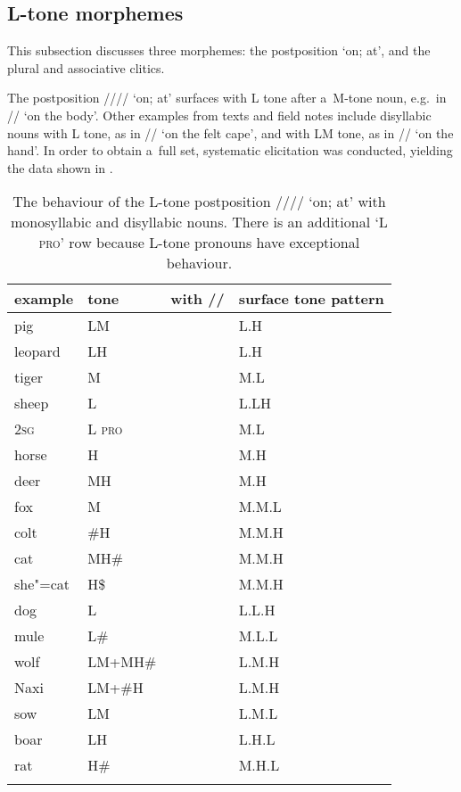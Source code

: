 \subsection{L-tone morphemes}
\label{sec:ltoneencliticspluralandassociativeplural}

This subsection discusses three morphemes: the postposition ‘on; at', and the plural and associative clitics. 

The postposition //// ‘on; at' surfaces with L tone after a~M-tone noun, e.g.~in // ‘on the body'. Other examples from texts and field notes include disyllabic nouns with L tone, as in // ‘on the felt cape', and with LM tone, as in // ‘on the hand'. In order to obtain a~full set, systematic elicitation was conducted, yielding the data shown in . 


\begin{table}%
	\caption{\label{tab:postpositionon}The behaviour of the L-tone postposition //// ‘on; at' with {monosyllabic} and disyllabic nouns. There is an additional ‘L \textsc{pro}’ row because L-tone pronouns have exceptional behaviour.}
	\begin{tabularx}{\textwidth}{ Q Q P{30mm} l }
		\lsptoprule
		example & tone & with // & surface tone pattern\\ \midrule
		pig & LM &  & L.H\\
		leopard & LH &  & L.H\\
		tiger & M &  & M.L\\
		sheep & L &  & L.LH\\
		\textsc{2sg} & L \textsc{pro} &  & M.L\\
		horse & H &  & M.H\\
		deer & MH &  & M.H\\ \addlinespace \hdashline \addlinespace
		fox & M &  & M.M.L\\
		colt & \#H &  & M.M.H\\
		cat & MH\# &  & M.M.H\\
		she"=cat & H\$ &  & M.M.H\\
		dog & L &  & L.L.H\\
		mule & L\# &  & M.L.L\\
		wolf & LM+MH\# &  & L.M.H\\
		Naxi & LM+\#H &  & L.M.H\\
		sow & LM &  & L.M.L\\
		boar & LH &  & L.H.L\\
		rat & H\# &  & M.H.L\\
		\lspbottomrule
	\end{tabularx}
\end{table}

